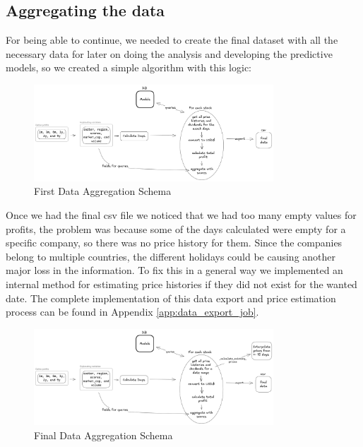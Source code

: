 \documentclass[11pt,english,a4paper,hidelinks]{book}
\begin{document}
\subsection{Aggregating the data}

For being able to continue, we needed to create the final dataset with all the necessary data for later on doing the analysis and developing the predictive models, so we created a simple algorithm with this logic:

\begin{figure}[H]
    \centering
    \includegraphics[width=0.8\textwidth]{images/tweenvest/First Data Aggregation Schema.png}
    \caption{First Data Aggregation Schema}
    \label{fig:first_data_aggregation_schema}
\end{figure}

\noindent Once we had the final csv file we noticed that we had too many empty values for profits, the problem was because some of the days calculated were empty for a specific company, so there was no price history for them. Since the companies belong to multiple countries, the different holidays could be causing another major loss in the information. To fix this in a general way we implemented an internal method for estimating price histories if they did not exist for the wanted date. The complete implementation of this data export and price estimation process can be found in Appendix \ref{app:data_export_job}.

\begin{figure}[H]
    \centering
    \includegraphics[width=0.8\textwidth]{images/tweenvest/Final Data Aggregation Schema.png}
    \caption{Final Data Aggregation Schema}
    \label{fig:final_data_aggregation_schema}
\end{figure}
\end{document}
